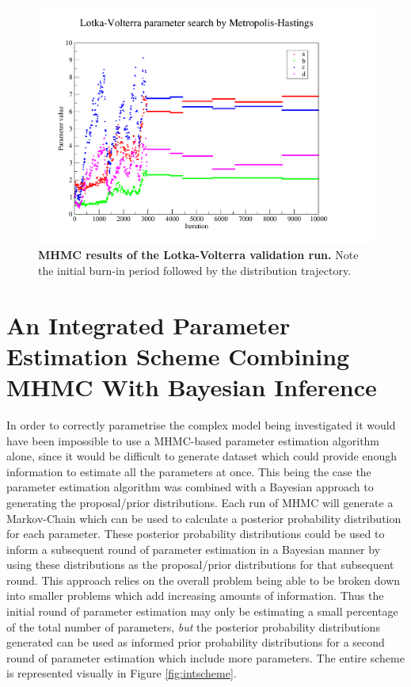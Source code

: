 \begin{figure}[tbp]
 \centering
 \includegraphics[width=13cm, trim=50px 35px 125px 30px, clip=true]{./03-parameterestimationmethodologies/data/LV_MCMC.pdf}
 \caption[{MHMC results of the Lotka-Volterra validation run.}]{{\bf MHMC results of the Lotka-Volterra validation run.} Note the initial burn-in period followed by the distribution trajectory.
 \label{fig:parameters}}
\end{figure}
\afterpage{\clearpage}

\section{An Integrated Parameter Estimation Scheme Combining MHMC With Bayesian Inference}
In order to correctly parametrise the complex model being investigated it would have been impossible to use a MHMC-based parameter estimation algorithm alone, since it would be difficult to generate dataset which could provide enough information to estimate all the parameters at once. This being the case the parameter estimation algorithm was combined with a Bayesian approach to generating the proposal/prior distributions. Each run of MHMC will generate a Markov-Chain which can be used to calculate a posterior probability distribution for each parameter. These posterior probability distributions could be used to inform a subsequent round of parameter estimation in a Bayesian manner by using these distributions as the proposal/prior distributions for that subsequent round. This approach relies on the overall problem being able to be broken down into smaller problems which add increasing amounts of information. Thus the initial round of parameter estimation may only be estimating a small percentage of the total number of parameters, \textit{but} the posterior probability distributions generated can be used as informed prior probability distributions for a second round of parameter estimation which include more parameters. The entire scheme is represented visually in Figure \ref{fig:intscheme}.

